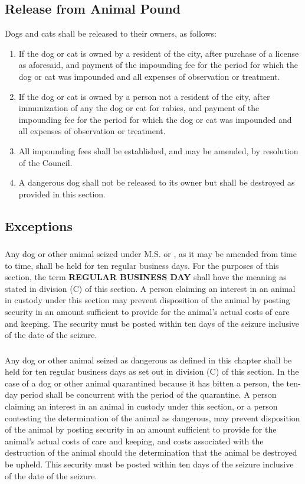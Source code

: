 \subsection{Release from Animal Pound}
Dogs and cats shall be released to their owners, as follows:
\begin{enumerate}[{\indent}1)]
    \item If the dog or cat is owned by a resident of the city, after purchase of a license as aforesaid, and payment of the impounding fee for the period for which the dog or cat was impounded and all expenses of observation or treatment.
    \item If the dog or cat is owned by a person not a resident of the city, after immunization of any the dog or cat for rabies, and payment of the impounding fee for the period for which the dog or cat was impounded and all expenses of observation or treatment.
    \item All impounding fees shall be established, and may be amended, by resolution of the Council.
    \item A dangerous dog shall not be released to its owner but shall be destroyed as provided in this section.
\end{enumerate}
\subsection{Exceptions}
\subsubsection{}
Any dog or other animal seized under M.S.  or , as it may be amended from time to time, shall be held for ten regular business days.  For the purposes of this section, the term \textbf{REGULAR BUSINESS DAY} shall have the meaning as stated in division (C) of this section.  A person claiming an interest in an animal in custody under this section may prevent disposition of the animal by posting security in an amount sufficient to provide for the animal’s actual costs of care and keeping.  The security must be posted within ten days of the seizure inclusive of the date of the seizure.
\subsubsection{}
Any dog or other animal seized as dangerous as defined in this chapter shall be held for ten regular business days as set out in division (C) of this section. In the case of a dog or other animal quarantined because it has bitten a person, the ten-day period shall be concurrent with the period of the quarantine. A person claiming an interest in an animal in custody under this section, or a person contesting the determination of the animal as dangerous, may prevent disposition of the animal by posting security in an amount sufficient to provide for the animal’s actual costs of care and keeping, and costs associated with the destruction of the animal should the determination that the animal be destroyed be upheld. This security must be posted within ten days of the seizure inclusive of the date of the seizure.
